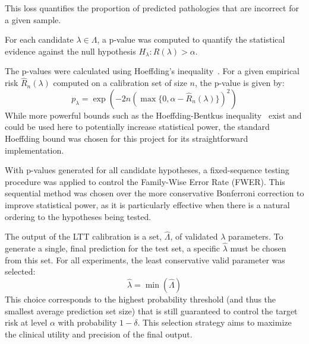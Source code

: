 This loss quantifies the proportion of predicted pathologies that are incorrect for a given sample.

For each candidate \(\lambda \in \Lambda\),
a p-value was computed to quantify the statistical evidence against the null hypothesis
\(H_\lambda: R(\lambda) > \alpha\).

The p-values were calculated using Hoeffding's inequality~\cite{hoeffding1963Probability}.
For a given empirical risk \(\hat{R}_n(\lambda)\) computed on a calibration set of size \(n\),
the p-value is given by:
\[
    p_\lambda = \exp\left(-2n\left(\max\{0, \alpha - \hat{R}_n(\lambda)\}\right)^2\right)
    \label{eq:hoeffding_pvalue}
\]
While more powerful bounds such as the Hoeffding-Bentkus inequality~\cite{bates2021rcps} exist
and could be used here to potentially increase statistical power,
the standard Hoeffding bound was chosen for this project
for its straightforward implementation.

With p-values generated for all candidate hypotheses,
a fixed-sequence testing procedure was applied
to control the Family-Wise Error Rate (FWER).
This sequential method was chosen over the more conservative
Bonferroni correction to improve statistical power,
as it is particularly effective when there is
a natural ordering to the hypotheses being tested.

The output of the LTT calibration is a set, \(\hat{\Lambda}\), of validated \(\lambda\) parameters.
To generate a single, final prediction for the test set,
a specific \(\hat{\lambda}\) must be chosen from this set.
For all experiments, the least conservative valid parameter was selected:
\[
    \hat{\lambda} = \min(\hat{\Lambda})
\]
This choice corresponds to the highest probability threshold
(and thus the smallest average prediction set size)
that is still guaranteed to control the target risk at level $\alpha$ with probability $1-\delta$.
This selection strategy aims to maximize the clinical utility and precision of the final output.
